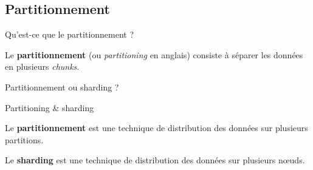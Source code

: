 
\subsection{Partitionnement}

\begin{frame}{Qu'est-ce que le partitionnement ?}

    \begin{definitionbox}
        Le \textbf{partitionnement} (ou \textit{partitioning} en anglais) consiste à séparer les données en plusieurs \textit{chunks}.
    \end{definitionbox}

    \begin{figure}[htb]
    \end{figure}

\end{frame}

\begin{frame}[standout]

    Partitionnement ou sharding ?

\end{frame}

\begin{frame}{Partitioning \& sharding}

    \begin{definitionbox}
        Le \textbf{partitionnement} est une technique de distribution des données sur plusieurs partitions.
    \end{definitionbox}

    \pause

    \begin{definitionbox}
        Le \textbf{sharding} est une technique de distribution des données sur plusieurs n\oe{}uds.
    \end{definitionbox}

\end{frame}

